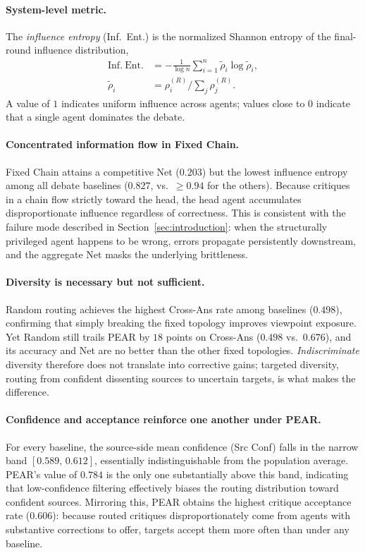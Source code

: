 \paragraph{System-level metric.}
The \emph{influence entropy} (Inf.\ Ent.) is the normalized Shannon entropy of the final-round influence distribution,
\begin{align*}
\mathrm{Inf.\ Ent.}
&=
-\frac{1}{\log n}
\sum_{i=1}^n
\tilde{\rho}_i \log \tilde{\rho}_i, \\
\tilde{\rho}_i
&=
\rho_i^{(R)}
\Big/
\sum_j \rho_j^{(R)} .
\end{align*}
A value of $1$ indicates uniform influence across agents; values close to $0$ indicate that a single agent dominates the debate.

 
\paragraph{Concentrated information flow in Fixed Chain.}
Fixed Chain attains a competitive Net ($0.203$) but the lowest influence entropy among all debate baselines ($0.827$, vs.\ $\geq 0.94$ for the others). Because critiques in a chain flow strictly toward the head, the head agent accumulates disproportionate influence regardless of correctness. This is consistent with the failure mode described in Section~\ref{sec:introduction}: when the structurally privileged agent happens to be wrong, errors propagate persistently downstream, and the aggregate Net masks the underlying brittleness.
 
\paragraph{Diversity is necessary but not sufficient.}
Random routing achieves the highest Cross-Ans rate among baselines ($0.498$), confirming that simply breaking the fixed topology improves viewpoint exposure. Yet Random still trails PEAR by $18$ points on Cross-Ans ($0.498$ vs.\ $0.676$), and its accuracy and Net are no better than the other fixed topologies. \emph{Indiscriminate} diversity therefore does not translate into corrective gains; targeted diversity, routing from confident dissenting sources to uncertain targets, is what makes the difference.
 
\paragraph{Confidence and acceptance reinforce one another under PEAR.}
For every baseline, the source-side mean confidence (Src Conf) falls in the narrow band $[0.589,\,0.612]$, essentially indistinguishable from the population average. PEAR's value of $0.784$ is the only one substantially above this band, indicating that low-confidence filtering effectively biases the routing distribution toward confident sources. Mirroring this, PEAR obtains the highest critique acceptance rate ($0.606$): because routed critiques disproportionately come from agents with substantive corrections to offer, targets accept them more often than under any baseline.
 
